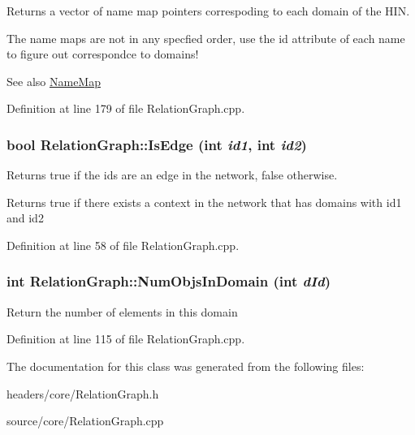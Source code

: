 Returns a vector of name map pointers correspoding to each domain of the HIN. 

The name maps are not in any specfied order, use the id attribute of each name to figure out correspondce to domains!

\begin{DoxySeeAlso}{See also}
\hyperlink{class_name_map}{NameMap} 
\end{DoxySeeAlso}


Definition at line 179 of file RelationGraph.cpp.

\hypertarget{class_relation_graph_a647ab3afb7708f13e5ec480462dedb39}{
\subsubsection[{IsEdge}]{\setlength{\rightskip}{0pt plus 5cm}bool RelationGraph::IsEdge (int {\em id1}, \/  int {\em id2})}}
\label{class_relation_graph_a647ab3afb7708f13e5ec480462dedb39}


Returns true if the ids are an edge in the network, false otherwise. 

Returns true if there exists a context in the network that has domains with id1 and id2 

Definition at line 58 of file RelationGraph.cpp.

\hypertarget{class_relation_graph_aea7dcd0adc08075a0b2e70854349f77c}{
\subsubsection[{NumObjsInDomain}]{\setlength{\rightskip}{0pt plus 5cm}int RelationGraph::NumObjsInDomain (int {\em dId})}}
\label{class_relation_graph_aea7dcd0adc08075a0b2e70854349f77c}
Return the number of elements in this domain 

Definition at line 115 of file RelationGraph.cpp.



The documentation for this class was generated from the following files:\begin{DoxyCompactItemize}
\item 
headers/core/RelationGraph.h\item 
source/core/RelationGraph.cpp\end{DoxyCompactItemize}
